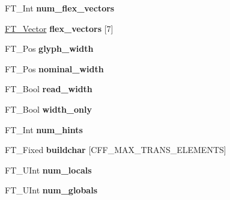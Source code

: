 \begin{DoxyCompactItemize}
\mbox{\label{struct_c_f_f___decoder___aef7e8a5c32357885d3e6c2777e1dd309}} 
F\+T\+\_\+\+Int {\bfseries num\+\_\+flex\+\_\+vectors}
\item 
\mbox{\label{struct_c_f_f___decoder___a075bfb59c5b5b5c16810727315657e3f}} 
\hyperlink{struct_f_t___vector__}{F\+T\+\_\+\+Vector} {\bfseries flex\+\_\+vectors} \mbox{[}7\mbox{]}
\item 
\mbox{\label{struct_c_f_f___decoder___a0d3d6ccc7097a1e256543f511d47c7e9}} 
F\+T\+\_\+\+Pos {\bfseries glyph\+\_\+width}
\item 
\mbox{\label{struct_c_f_f___decoder___a4e29c00c24380a115f6b4027f8ad257f}} 
F\+T\+\_\+\+Pos {\bfseries nominal\+\_\+width}
\item 
\mbox{\label{struct_c_f_f___decoder___a19c69b106557653d4a02ab16152fdb79}} 
F\+T\+\_\+\+Bool {\bfseries read\+\_\+width}
\item 
\mbox{\label{struct_c_f_f___decoder___a0e2c2a7bb6a7c56e6e883058e7f03119}} 
F\+T\+\_\+\+Bool {\bfseries width\+\_\+only}
\item 
\mbox{\label{struct_c_f_f___decoder___a386558299ea4efd85294b93ad515ff2b}} 
F\+T\+\_\+\+Int {\bfseries num\+\_\+hints}
\item 
\mbox{\label{struct_c_f_f___decoder___a57f3870e46c81c7c2f10394084b451b1}} 
F\+T\+\_\+\+Fixed {\bfseries buildchar} \mbox{[}C\+F\+F\+\_\+\+M\+A\+X\+\_\+\+T\+R\+A\+N\+S\+\_\+\+E\+L\+E\+M\+E\+N\+TS\mbox{]}
\item 
\mbox{\label{struct_c_f_f___decoder___ac6c2553ef54a77da4100a28d71b3aa34}} 
F\+T\+\_\+\+U\+Int {\bfseries num\+\_\+locals}
\item 
\mbox{\label{struct_c_f_f___decoder___a497ad7a1cf8ff1b1c40b4bffd3d2bb94}} 
F\+T\+\_\+\+U\+Int {\bfseries num\+\_\+globals}
\item 
\mbox{\label{struct_c_f_f___decoder___a3cdcfb160c93736ad91e17682296749e}} 

\end{DoxyCompactItemize}
